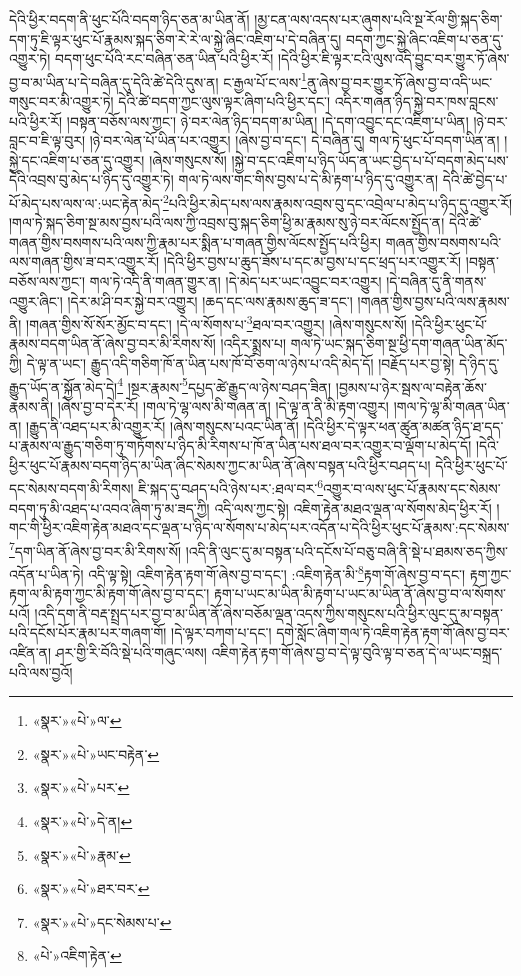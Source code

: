 དེའི་ཕྱིར་བདག་ནི་ཕུང་པོའི་བདག་ཉིད་ཅན་མ་ཡིན་ནོ། །མྱ་ངན་ལས་འདས་པར་ཞུགས་པའི་སྔ་རོལ་གྱི་སྐད་ཅིག་དག་ཏུ་ཇི་ལྟར་ཕུང་པོ་རྣམས་སྐད་ཅིག་རེ་རེ་ལ་སྐྱེ་ཞིང་འཇིག་པ་དེ་བཞིན་དུ། བདག་ཀྱང་སྐྱེ་ཞིང་འཇིག་པ་ཅན་དུ་འགྱུར་ཏེ། བདག་ཕུང་པོའི་རང་བཞིན་ཅན་ཡིན་པའི་ཕྱིར་རོ། །དེའི་ཕྱིར་ཇི་ལྟར་ངའི་ལུས་འདི་བྱུང་བར་གྱུར་ཏོ་ཞེས་བྱ་བ་མ་ཡིན་པ་དེ་བཞིན་དུ་དེའི་ཚེ་དེའི་དུས་ན། ང་རྒྱལ་པོ་ང་ལས་\footnote{«སྣར་»«པེ་»ལ་}ནུ་ཞེས་བྱ་བར་གྱུར་ཏོ་ཞེས་བྱ་བ་འདི་ཡང་གསུང་བར་མི་འགྱུར་ཏེ། དེའི་ཚེ་བདག་ཀྱང་ལུས་ལྟར་ཞིག་པའི་ཕྱིར་དང་། འདིར་གཞན་ཉིད་སྐྱེ་བར་ཁས་བླངས་པའི་ཕྱིར་རོ། །བསྟན་བཅོས་ལས་ཀྱང་། ཉེ་བར་ལེན་ཉིད་བདག་མ་ཡིན། །དེ་དག་འབྱུང་དང་འཇིག་པ་ཡིན། །ཉེ་བར་བླང་བ་ཇི་ལྟ་བུར། །ཉེ་བར་ལེན་པོ་ཡིན་པར་འགྱུར། །ཞེས་བྱ་བ་དང་། དེ་བཞིན་དུ། གལ་ཏེ་ཕུང་པོ་བདག་ཡིན་ན། །སྐྱེ་དང་འཇིག་པ་ཅན་དུ་འགྱུར། །ཞེས་གསུངས་སོ། །སྐྱེ་བ་དང་འཇིག་པ་ཉིད་ཡོད་ན་ཡང་བྱེད་པ་པོ་བདག་མེད་པས་དེའི་འབྲས་བུ་མེད་པ་ཉིད་དུ་འགྱུར་ཏེ། གལ་ཏེ་ལས་གང་གིས་བྱས་པ་དེ་མི་རྟག་པ་ཉིད་དུ་འགྱུར་ན། དེའི་ཚེ་བྱེད་པ་པོ་མེད་པས་ལས་ལ་:ཡང་རྟེན་མེད་\footnote{«སྣར་»«པེ་»ཡང་བརྟེན་}པའི་ཕྱིར་མེད་པས་ལས་རྣམས་འབྲས་བུ་དང་འབྲེལ་པ་མེད་པ་ཉིད་དུ་འགྱུར་རོ། །གལ་ཏེ་སྐད་ཅིག་སྔ་མས་བྱས་པའི་ལས་ཀྱི་འབྲས་བུ་སྐད་ཅིག་ཕྱི་མ་རྣམས་སུ་ཉེ་བར་ལོངས་སྤྱོད་ན། དེའི་ཚེ་གཞན་གྱིས་བསགས་པའི་ལས་ཀྱི་རྣམ་པར་སྨིན་པ་གཞན་གྱིས་ལོངས་སྤྱོད་པའི་ཕྱིར། གཞན་གྱིས་བསགས་པའི་ལས་གཞན་གྱིས་ཟ་བར་འགྱུར་རོ། །དེའི་ཕྱིར་བྱས་པ་ཆུད་ཟོས་པ་དང་མ་བྱས་པ་དང་ཕྲད་པར་འགྱུར་རོ། །བསྟན་བཅོས་ལས་ཀྱང་། གལ་ཏེ་འདི་ནི་གཞན་གྱུར་ན། །དེ་མེད་པར་ཡང་འབྱུང་བར་འགྱུར། །དེ་བཞིན་དུ་ནི་གནས་འགྱུར་ཞིང་། །དེར་མ་ཤི་བར་སྐྱེ་བར་འགྱུར། །ཆད་དང་ལས་རྣམས་ཆུད་ཟ་དང་། །གཞན་གྱིས་བྱས་པའི་ལས་རྣམས་ནི། །གཞན་གྱིས་སོ་སོར་མྱོང་བ་དང་། །དེ་ལ་སོགས་པ་\footnote{«སྣར་»«པེ་»པར་}ཐལ་བར་འགྱུར། །ཞེས་གསུངས་སོ། །དེའི་ཕྱིར་ཕུང་པོ་རྣམས་བདག་ཡིན་ནོ་ཞེས་བྱ་བར་མི་རིགས་སོ། །འདིར་སྨྲས་པ། གལ་ཏེ་ཡང་སྐད་ཅིག་སྔ་ཕྱི་དག་གཞན་ཡིན་མོད་ཀྱི། དེ་ལྟ་ན་ཡང་། རྒྱུད་འདི་གཅིག་ཁོ་ན་ཡིན་པས་ཁོ་བོ་ཅག་ལ་ཉེས་པ་འདི་མེད་དོ། །བརྗོད་པར་བྱ་སྟེ། དེ་ཉིད་དུ་རྒྱུད་ཡོད་ན་སྐྱོན་མེད་དེ།\footnote{«སྣར་»«པེ་»དེ་ན།} །སྔར་རྣམས་\footnote{«སྣར་»«པེ་»རྣམ་}དཔྱད་ཚེ་རྒྱུད་ལ་ཉེས་བཤད་ཟིན། །བྱམས་པ་ཉེར་སྦས་ལ་བརྟེན་ཆོས་རྣམས་ནི། །ཞེས་བྱ་བ་དེར་རོ། །གལ་ཏེ་ལྷ་ལས་མི་གཞན་ན། །དེ་ལྟ་ན་ནི་མི་རྟག་འགྱུར། །གལ་ཏེ་ལྷ་མི་གཞན་ཡིན་ན། །རྒྱུད་ནི་འཐད་པར་མི་འགྱུར་རོ། །ཞེས་གསུངས་པའང་ཡིན་ནོ། །དེའི་ཕྱིར་དེ་ལྟར་ཕན་ཚུན་མཚན་ཉིད་ཐ་དད་པ་རྣམས་ལ་རྒྱུད་གཅིག་ཏུ་གཏོགས་པ་ཉིད་མི་རིགས་པ་ཁོ་ན་ཡིན་པས་ཐལ་བར་འགྱུར་བ་ལྡོག་པ་མེད་དོ། །དེའི་ཕྱིར་ཕུང་པོ་རྣམས་བདག་ཉིད་མ་ཡིན་ཞིང་སེམས་ཀྱང་མ་ཡིན་ནོ་ཞེས་བསྟན་པའི་ཕྱིར་བཤད་པ། དེའི་ཕྱིར་ཕུང་པོ་དང་སེམས་བདག་མི་རིགས། ཇི་སྐད་དུ་བཤད་པའི་ཉེས་པར་:ཐལ་བར་\footnote{«སྣར་»«པེ་»ཐར་བར་}འགྱུར་བ་ལས་ཕུང་པོ་རྣམས་དང་སེམས་བདག་ཏུ་མི་འཐད་པ་འབའ་ཞིག་ཏུ་མ་ཟད་ཀྱི། འདི་ལས་ཀྱང་སྟེ། འཇིག་རྟེན་མཐའ་ལྡན་ལ་སོགས་མེད་ཕྱིར་རོ། །གང་གི་ཕྱིར་འཇིག་རྟེན་མཐའ་དང་ལྡན་པ་ཉིད་ལ་སོགས་པ་མེད་པར་འདོན་པ་དེའི་ཕྱིར་ཕུང་པོ་རྣམས་:དང་སེམས་\footnote{«སྣར་»«པེ་»དང་སེམས་པ་}དག་ཡིན་ནོ་ཞེས་བྱ་བར་མི་རིགས་སོ། །འདི་ནི་ལུང་དུ་མ་བསྟན་པའི་དངོས་པོ་བཅུ་བཞི་ནི་སྡེ་པ་ཐམས་ཅད་ཀྱིས་འདོན་པ་ཡིན་ཏེ། འདི་ལྟ་སྟེ། འཇིག་རྟེན་རྟག་གོ་ཞེས་བྱ་བ་དང་། :འཇིག་རྟེན་མི་\footnote{«པེ་»འཇིག་རྟེན་}རྟག་གོ་ཞེས་བྱ་བ་དང་། རྟག་ཀྱང་རྟག་ལ་མི་རྟག་ཀྱང་མི་རྟག་གོ་ཞེས་བྱ་བ་དང་། རྟག་པ་ཡང་མ་ཡིན་མི་རྟག་པ་ཡང་མ་ཡིན་ནོ་ཞེས་བྱ་བ་ལ་སོགས་པའོ། །འདི་དག་ནི་བརྡ་སྤྲད་པར་བྱ་བ་མ་ཡིན་ནོ་ཞེས་བཅོམ་ལྡན་འདས་ཀྱིས་གསུངས་པའི་ཕྱིར་ལུང་དུ་མ་བསྟན་པའི་དངོས་པོར་རྣམ་པར་གཞག་གོ། །དེ་ལྟར་བཀག་པ་དང་། དགེ་སློང་ཞིག་གལ་ཏེ་འཇིག་རྟེན་རྟག་གོ་ཞེས་བྱ་བར་འཛིན་ན། ཤར་གྱི་རི་བོའི་སྡེ་པའི་གཞུང་ལས། འཇིག་རྟེན་རྟག་གོ་ཞེས་བྱ་བ་དེ་ལྟ་བུའི་ལྟ་བ་ཅན་དེ་ལ་ཡང་བསྐྲད་པའི་ལས་བྱའོ། 